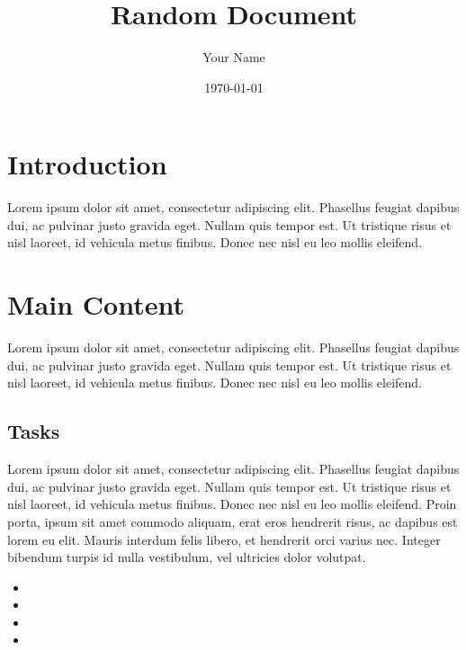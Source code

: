\documentclass{article}
\begin{document}
\title{Random Document}
\author{Your Name}
\date{\today}
\maketitle

\section{Introduction}
Lorem ipsum dolor sit amet, consectetur adipiscing elit. Phasellus feugiat dapibus dui, ac pulvinar justo gravida eget. Nullam quis tempor est. Ut tristique risus et nisl laoreet, id vehicula metus finibus. Donec nec nisl eu leo mollis eleifend.

\section{Main Content}
Lorem ipsum dolor sit amet, consectetur adipiscing elit. Phasellus feugiat dapibus dui, ac pulvinar justo gravida eget. Nullam quis tempor est. Ut tristique risus et nisl laoreet, id vehicula metus finibus. Donec nec nisl eu leo mollis eleifend.


\subsection{Tasks}
Lorem ipsum dolor sit amet, consectetur adipiscing elit. Phasellus feugiat dapibus dui, ac pulvinar justo gravida eget. Nullam quis tempor est. Ut tristique risus et nisl laoreet, id vehicula metus finibus. Donec nec nisl eu leo mollis eleifend. Proin porta, ipsum sit amet commodo aliquam, erat eros hendrerit risus, ac dapibus est lorem eu elit. Mauris interdum felis libero, et hendrerit orci varius nec. Integer bibendum turpis id nulla vestibulum, vel ultricies dolor volutpat.

\begin{itemize}
    \item  {}
    \item  {}
    \item  {}
    \item  {}
\end{itemize}
\end{document}
